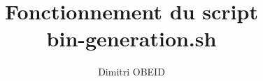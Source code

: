 \documentclass[a4paper,10pt]{article}
\title{\color{sec1}Fonctionnement du script\\ \color{sec2}bin-generation.sh\color{sec1}}\color{text}
\author{Dimitri OBEID}
\begin{document}
    \maketitle
    \newpage

    \hypertarget{contents}{}
    \tableofcontents
    \newpage

    \begin{abstract}

    \end{abstract}

    \section{}




\end{document}

